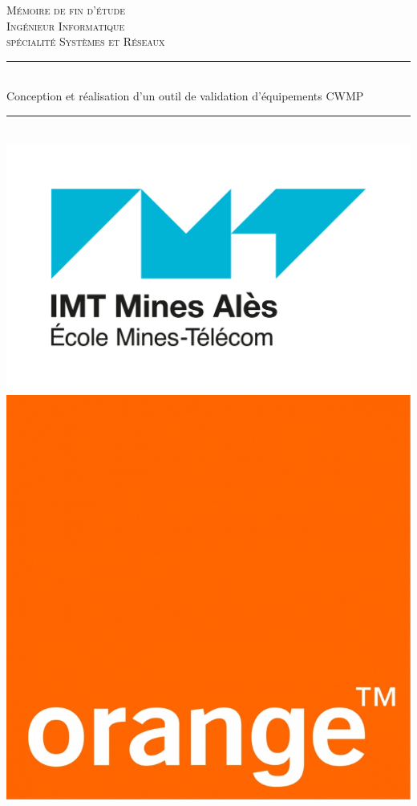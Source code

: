 \documentclass[12pt,a4paper]{report}
\newcommand{\HRule}{\rule{\linewidth}{0.5mm}}
\begin{document}
\begin{titlepage}
  \begin{center}

    \textsc{\LARGE Mémoire de fin d'étude}\\[2cm]

    \textsc{\Large Ingénieur Informatique\\ spécialité Systèmes et Réseaux}\\[1.5cm]

    \HRule \\[0.4cm]
    { \huge Conception et réalisation d'un outil de validation d'équipements CWMP\\[0.4cm] }

    \HRule \\[2cm]
    \includegraphics[scale=0.2]{./img/imt_mines_ales-bleu.jpg}
    \includegraphics[scale=0.1]{./img/orange.jpg}
    \\[2cm]


\end{center}
\end{titlepage}
\end{document}
